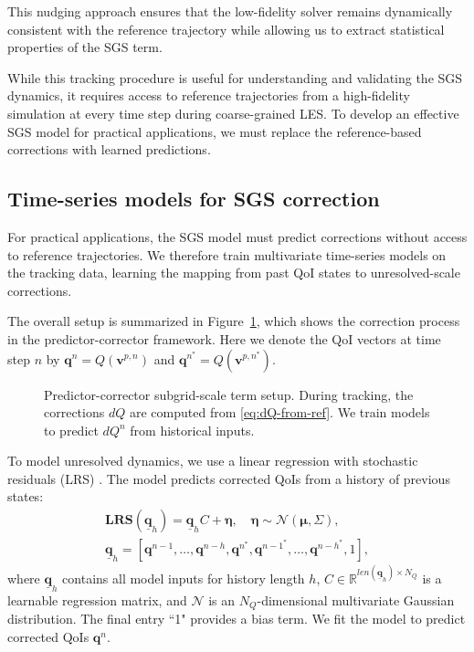 \documentclass[]{elsarticle}
\begin{document}
This nudging approach ensures that the low-fidelity solver remains dynamically consistent with the reference trajectory while allowing us to extract statistical properties of the SGS term.

While this tracking procedure is useful for understanding and validating the SGS dynamics, it requires access to reference trajectories from a high-fidelity simulation at every time step during coarse-grained LES. To develop an effective SGS model for practical applications, we must replace the reference-based corrections with learned predictions. 

\subsection{Time-series models for SGS correction} \label{section:Time-Series Models for SGS Correction}

For practical applications, the SGS model must predict corrections without access to reference trajectories. We therefore train multivariate time-series models on the tracking data, learning the mapping from past QoI states to unresolved-scale corrections.

The overall setup is summarized in Figure~\ref{fig:pred-cor-sgs-model-setup}, which shows the correction process in the predictor-corrector framework. Here we denote the QoI vectors at time step $n$ by $\boldsymbol{q}^n = Q(\boldsymbol{v}^{p,n})$ and $\boldsymbol{q}^{n^*} = Q(\boldsymbol{v}^{p,n^*})$.

\begin{figure}
    \centering
    
    
    \caption{Predictor-corrector subgrid-scale term setup. During tracking, the corrections $dQ$ are computed from \eqref{eq:dQ-from-ref}. We train models to predict $dQ^{n}$ from historical inputs.}
    \label{fig:pred-cor-sgs-model-setup}
\end{figure}

To model unresolved dynamics, we use a linear regression with stochastic residuals (LRS) \cite{hoekstra_reduced_2026}. The model predicts corrected QoIs from a history of previous states:
\begin{align}
    \mathbf{LRS}(\underline{\mathbf{q}}_h) = \underline{\mathbf{q}}_h C + \boldsymbol{\eta}, \quad \boldsymbol{\eta} \sim \mathcal{N}(\boldsymbol{\mu}, \Sigma), \nonumber\\
    \underline{\mathbf{q}}_h = [\mathbf{q}^{n-1}, \dots, \mathbf{q}^{n-h}, \mathbf{q}^{n^*}, \mathbf{q}^{n-1^*}, \dots, \mathbf{q}^{n-h^*}, 1], \label{eq:Linear-Regression-with-Stochastic-Residuals}
\end{align}
where $\underline{\mathbf{q}}_h$ contains all model inputs for history length $h$, $C \in \mathbb{R}^{ len(\underline{\mathbf{q}}_h) \times N_Q}$ is a learnable regression matrix, and $\mathcal{N}$ is an $N_Q$-dimensional multivariate Gaussian distribution. The final entry ``1" provides a bias term. We fit the model to predict corrected QoIs $\mathbf{q}^{n}$.
\end{document}
